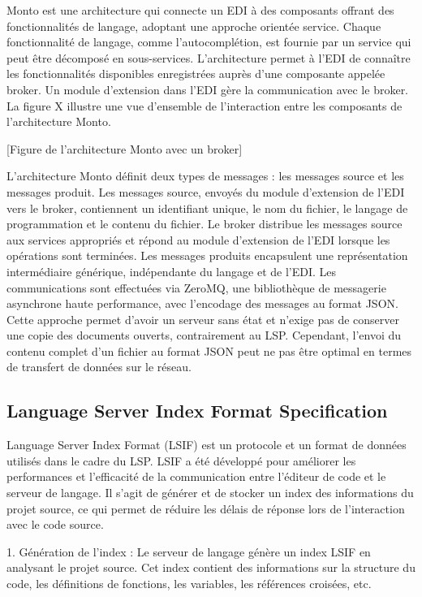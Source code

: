 Monto est une architecture qui connecte un EDI à des composants offrant des fonctionnalités de langage, adoptant une approche orientée service. Chaque fonctionnalité de langage, comme l'autocomplétion, est fournie par un service qui peut être décomposé en sous-services. L'architecture permet à l'EDI de connaître les fonctionnalités disponibles enregistrées auprès d'une composante appelée broker. Un module d'extension dans l'EDI gère la communication avec le broker. La figure X illustre une vue d'ensemble de l'interaction entre les composants de l'architecture Monto.

    [Figure de l'architecture Monto avec un broker]


L'architecture Monto définit deux types de messages : les messages source et les messages produit. Les messages source, envoyés du module d'extension de l'EDI vers le broker, contiennent un identifiant unique, le nom du fichier, le langage de programmation et le contenu du fichier. Le broker distribue les messages source aux services appropriés et répond au module d'extension de l'EDI lorsque les opérations sont terminées. Les messages produits encapsulent une représentation intermédiaire générique, indépendante du langage et de l'EDI. Les communications sont effectuées via ZeroMQ, une bibliothèque de messagerie asynchrone haute performance, avec l'encodage des messages au format JSON. Cette approche permet d'avoir un serveur sans état et n'exige pas de conserver une copie des documents ouverts, contrairement au LSP. Cependant, l'envoi du contenu complet d'un fichier au format JSON peut ne pas être optimal en termes de transfert de données sur le réseau.


\subsection{Language Server Index Format Specification}

Language Server Index Format (LSIF) est un protocole et un format de données utilisés dans le cadre du LSP. LSIF a été développé pour améliorer les performances et l'efficacité de la communication entre l'éditeur de code et le serveur de langage. Il s'agit de générer et de stocker un index des informations du projet source, ce qui permet de réduire les délais de réponse lors de l'interaction avec le code source.

1. Génération de l'index : Le serveur de langage génère un index LSIF en analysant le projet source. Cet index contient des informations sur la structure du code, les définitions de fonctions, les variables, les références croisées, etc.


